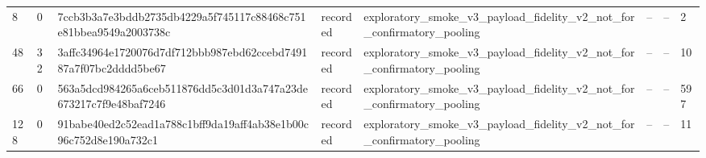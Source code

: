 \begin{table}[htbp]
\begin{tabular}{llllllll}
8 & 0 & 7ccb3b3a7e3bddb2735db4229a5f745117c88468c751e81bbea9549a2003738c & recorded & exploratory\_smoke\_v3\_payload\_fidelity\_v2\_not\_for\_confirmatory\_pooling & -- & -- & 2 \\
48 & 32 & 3affc34964e1720076d7df712bbb987ebd62ccebd749187a7f07bc2dddd5be67 & recorded & exploratory\_smoke\_v3\_payload\_fidelity\_v2\_not\_for\_confirmatory\_pooling & -- & -- & 10 \\
66 & 0 & 563a5dcd984265a6ceb511876dd5c3d01d3a747a23de673217c7f9e48baf7246 & recorded & exploratory\_smoke\_v3\_payload\_fidelity\_v2\_not\_for\_confirmatory\_pooling & -- & -- & 597 \\
128 & 0 & 91babe40ed2c52ead1a788c1bff9da19aff4ab38e1b00c96c752d8e190a732c1 & recorded & exploratory\_smoke\_v3\_payload\_fidelity\_v2\_not\_for\_confirmatory\_pooling & -- & -- & 11 \\
\hline
\end{tabular}
\end{table}
